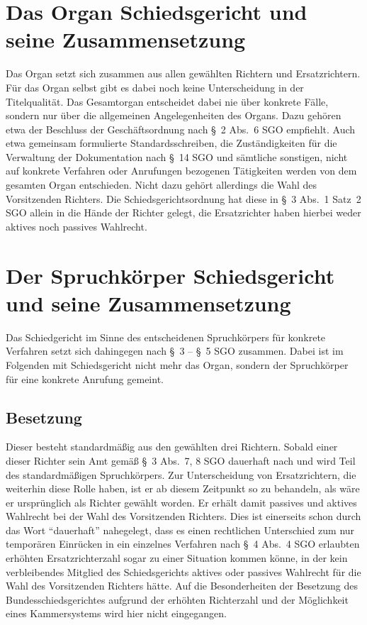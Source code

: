 \section{Das Organ Schiedsgericht und seine Zusammensetzung}
\label{Zusammensetzung:Organ}
Das Organ setzt sich zusammen aus allen gewählten Richtern und Ersatzrichtern.
Für das Organ selbst gibt es dabei noch keine Unterscheidung in der Titelqualität.
Das Gesamtorgan entscheidet dabei nie über konkrete Fälle, sondern nur über die allgemeinen Angelegenheiten des Organs.
Dazu gehören etwa der Beschluss der Geschäftsordnung nach \S~2 Abs.~6 SGO empfiehlt.
Auch etwa gemeinsam formulierte Standardsschreiben, die Zuständigkeiten für die Verwaltung der Dokumentation nach \S~14 SGO und sämtliche sonstigen, nicht auf konkrete Verfahren oder Anrufungen bezogenen Tätigkeiten werden von dem gesamten Organ entschieden.
Nicht dazu gehört allerdings die Wahl des Vorsitzenden Richters.
Die Schiedsgerichtsordnung hat diese in \S~3 Abs.~1 Satz~2 SGO allein in die Hände der Richter gelegt, die Ersatzrichter haben hierbei weder aktives noch passives Wahlrecht.

\section{Der Spruchkörper Schiedsgericht und seine Zusammensetzung}
\label{Zusammensetzung:Spruchkoerper}
Das Schiedgericht im Sinne des entscheidenen Spruchkörpers für konkrete Verfahren setzt sich dahingegen nach \S~3 -- \S~5 SGO zusammen. Dabei ist im Folgenden mit Schiedsgericht nicht mehr das Organ, sondern der Spruchkörper für eine konkrete Anrufung gemeint.

\subsection{Besetzung}
\label{Zusammensetzung:Spruchkoerper:Besetzung}
Dieser besteht standardmäßig aus den gewählten drei Richtern.
Sobald einer dieser Richter sein Amt gemäß \S~3 Abs.~7, 8 SGO dauerhaft nach und wird Teil des standardmäßigen Spruchkörpers.
Zur Unterscheidung von Ersatzrichtern, die weiterhin diese Rolle haben, ist er ab diesem Zeitpunkt so zu behandeln, als wäre er ursprünglich als Richter gewählt worden.
Er erhält damit passives und aktives Wahlrecht bei der Wahl des Vorsitzenden Richters.
Dies ist einerseits schon durch das Wort \enquote{dauerhaft} nahegelegt, dass es einen rechtlichen Unterschied zum nur temporären Einrücken in ein einzelnes Verfahren nach \S~4 Abs.~4 SGO erlaubten erhöhten Ersatzrichterzahl sogar zu einer Situation kommen könne, in der kein verbleibendes Mitglied des Schiedsgerichts aktives oder passives Wahlrecht für die Wahl des Vorsitzenden Richters hätte.
Auf die Besonderheiten der Besetzung des Bundesschiedsgerichtes aufgrund der erhöhten Richterzahl und der Möglichkeit eines Kammersystems wird hier nicht eingegangen.

